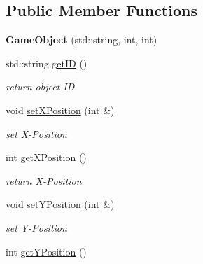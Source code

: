\subsection*{Public Member Functions}
\begin{DoxyCompactItemize}
\item 
\mbox{\label{class_game_object_adf9acb9e2d250f42f322d9b367eb7ff4}} 
{\bfseries Game\+Object} (std\+::string, int, int)
\item 
\mbox{\label{class_game_object_a54cb68b217bc51148649d10dc4f9bcbf}} 
std\+::string \mbox{\hyperlink{class_game_object_a54cb68b217bc51148649d10dc4f9bcbf}{get\+ID}} ()
\begin{DoxyCompactList}\small\item\em return object ID \end{DoxyCompactList}\item 
\mbox{\label{class_game_object_accd8d02181c8a794a583ae5bb1bc1351}} 
void \mbox{\hyperlink{class_game_object_accd8d02181c8a794a583ae5bb1bc1351}{set\+X\+Position}} (int \&)
\begin{DoxyCompactList}\small\item\em set X-\/\+Position \end{DoxyCompactList}\item 
\mbox{\label{class_game_object_ab5e682e5f30212535f21b00f7ac5aa7d}} 
int \mbox{\hyperlink{class_game_object_ab5e682e5f30212535f21b00f7ac5aa7d}{get\+X\+Position}} ()
\begin{DoxyCompactList}\small\item\em return X-\/\+Position \end{DoxyCompactList}\item 
\mbox{\label{class_game_object_a8e561a36165c45b8eb48e898abca6024}} 
void \mbox{\hyperlink{class_game_object_a8e561a36165c45b8eb48e898abca6024}{set\+Y\+Position}} (int \&)
\begin{DoxyCompactList}\small\item\em set Y-\/\+Position \end{DoxyCompactList}\item 
\mbox{\label{class_game_object_a2c986fbc8dc62a1c187466a4ab48bebd}} 
int \mbox{\hyperlink{class_game_object_a2c986fbc8dc62a1c187466a4ab48bebd}{get\+Y\+Position}} ()

\end{DoxyCompactItemize}
